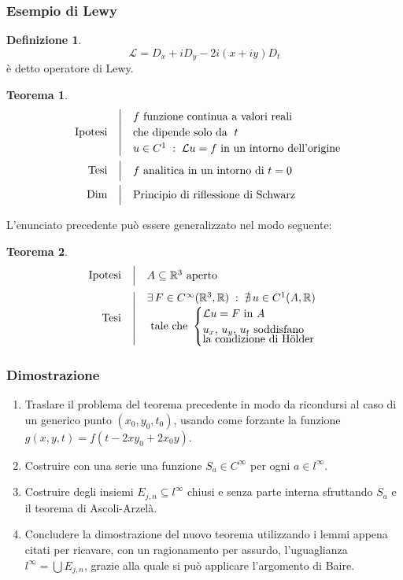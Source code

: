 \documentclass[serif,notheorems]{beamer}
\makeatletter
\newenvironment{ipotesi}%
{\quad\left|\quad\def\arraystretch{1.2}\begin{array}{@{}l@{}}}%
{\end{array}\right.}
\newcommand{\hpth}[2]
{
\begin{align*}
\quad
\text{Ipotesi}
&\begin{ipotesi}
#1
\end{ipotesi}\\
\text{Tesi}
&\begin{ipotesi}
#2
\end{ipotesi}
\end{align*}
}
\newcommand{\hpthdim}[3]
{
\begin{align*}
\quad
\text{Ipotesi}
&\begin{ipotesi} 
#1
\end{ipotesi}\\
\text{Tesi}
&\begin{ipotesi}
#2
\end{ipotesi}\\
\text{Dim}
&\begin{ipotesi}
#3
\end{ipotesi}
\end{align*}
}
\theoremstyle{definition} %
\newtheorem{theorem}{Teorema}[section] %
\newtheorem{definition}{Definizione}[section] %
\theoremstyle{remark}
\makeatother
\begin{document}
\begin{frame}
\frametitle{Esempio di Lewy}
\begin{definition}
$$\mathcal{L}=D_x+iD_y-2i(x+iy)D_t$$
è detto operatore di Lewy.
\end{definition}
\end{frame}

\begin{frame}
\begin{theorem}
\hpthdim{
f \text{ funzione continua a valori reali}\\ 
\text{che dipende solo da } \; t\\
u\in C^1\;:\;\mathcal{L}u=f \text{ in un intorno dell'origine }
}
{f \text{ analitica in un intorno di } t=0}{
\text{Principio di riflessione di Schwarz}
}
\end{theorem}
\end{frame}

\begin{frame}
L'enunciato precedente può essere generalizzato nel modo seguente:
\begin{theorem}
\hpth{
A \subseteq \mathbb{R}^3 \text{ aperto }\\
}
{
\exists \, F \in C^{\infty}(\mathbb{R}^3,\mathbb{R}) \; : \; \nexists \, u \in C^1(A,\mathbb{R}) \\ \text{ tale che }
\begin{cases}
\mathcal{L}u=F \text{ in } A\\
\vspace{-2mm}
u_x,\,u_y,\,u_t \text{ soddisfano} \\
\text {la condizione di Hölder }
\end{cases}
}
\end{theorem}
\end{frame}

\begin{frame}
\frametitle{Dimostrazione}
\begin{enumerate}
\item
Traslare il problema del teorema precedente in modo da ricondursi al caso di un generico punto $(x_0,y_0,t_0)$, usando come forzante la funzione $g(x,y,t)=f(t-2xy_0+2x_0y)$.
\item
Costruire con una serie una funzione $S_a \in C^\infty$ per ogni $a \in l^\infty$.
\item
Costruire degli insiemi $E_{j,n} \subseteq l^\infty$ chiusi e senza parte interna sfruttando $S_a$ e il teorema di Ascoli-Arzelà.
\item
Concludere la dimostrazione del nuovo teorema utilizzando i lemmi appena citati per ricavare, con un ragionamento per assurdo, l'uguaglianza $l^\infty = \bigcup E_{j,n}$, grazie alla quale si può applicare l'argomento di Baire.
\end{enumerate}
\end{frame}
\end{document}
